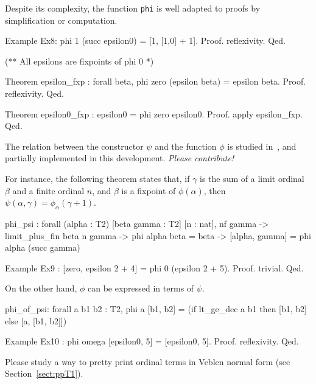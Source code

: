 {Despite its complexity, the function \texttt{phi} is well adapted to proofs by simplification or computation.
\begin{Coqsrc}
Example Ex8:  phi 1 (succ epsilon0) = [1, [1,0] + 1].
Proof. reflexivity. Qed.
\end{Coqsrc}

\begin{Coqsrc}
(**  All epsilons are fixpoints of phi 0 *)

Theorem epsilon_fxp : forall beta, phi zero (epsilon beta) =
                                   epsilon beta.
Proof. reflexivity. Qed.

Theorem epsilon0_fxp : epsilon0 = phi zero epsilon0.
Proof. apply epsilon_fxp. Qed.
\end{Coqsrc}


The relation between the constructor $\psi$ and the function $\phi$ is
studied in~\cite{schutte}, and partially implemented in this development.
\emph{Please contribute!}
 
For instance, the following theorem states that, if $\gamma$ is the sum of a limit ordinal $\beta$ and a finite ordinal $n$, and $\beta$ is a fixpoint of
$\phi(\alpha)$, then $\psi(\alpha,\gamma)=\phi_\alpha(\gamma+1)$.

\begin{Coqanswer}
phi_psi :
forall (alpha : T2) [beta gamma : T2] [n : nat],
nf gamma ->
limit_plus_fin beta n gamma ->
phi alpha beta = beta -> [alpha, gamma] = phi alpha (succ gamma)
\end{Coqanswer}

\begin{Coqsrc}
Example Ex9 : [zero, epsilon 2 + 4] = phi 0 (epsilon 2 + 5).
Proof. trivial. Qed.
\end{Coqsrc}

On the other hand, $\phi$ can be expressed in terms of $\psi$.

\begin{Coqanswer}
phi_of_psi:
  forall a b1 b2 : T2,
  phi a [b1, b2] = (if lt_ge_dec a b1 then [b1, b2] else [a, [b1, b2]])
\end{Coqanswer}

\begin{Coqsrc}
Example Ex10 : phi omega [epsilon0, 5] = [epsilon0, 5].
Proof. reflexivity. Qed.
\end{Coqsrc}

\begin{project}
Please study a way to pretty print ordinal terms in Veblen normal form (see Section~\vref{sect:ppT1}).
\end{project}

}
